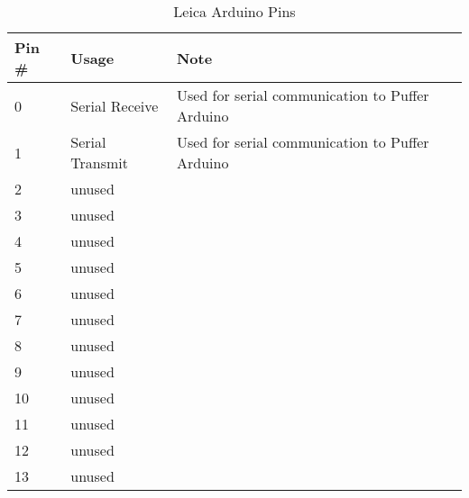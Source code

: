\documentclass[11pt,fleqn]{book} %
\begin{document}
\begin{appendices}
\begin{table}[h]
\centering
\begin{tabular}{l l p{160pt}}
\toprule
\textbf{Pin \#} & \textbf{Usage} & \textbf{Note}\\
\midrule
0 	& Serial Receive 	& Used for serial communication to Puffer Arduino\\
1 	& Serial Transmit  	& Used for serial communication to Puffer Arduino\\
2 	& unused &  \\
3 	& unused &  \\
4 	& unused &  \\
5 	& unused &  \\
6 	& unused &  \\
7 	& unused &  \\
8 	& unused &  \\
9 	& unused &  \\
10 	& unused & \\
11 	& unused &\\
12 	& unused &  \\
13 	& unused &  \\
\bottomrule
\end{tabular}
\caption{Leica Arduino Pins}
\end{table}

\clearpage

\end{appendices}




%
%
%
%
\end{document}
